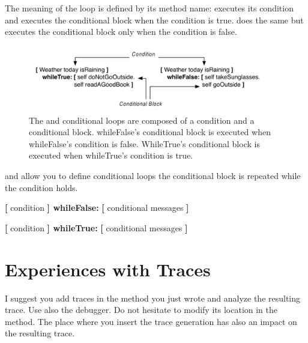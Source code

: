 

The meaning of the loop is defined by its method name:  executes its condition and  executes the conditional block when the condition is true.   does the same but executes the conditional block only when the condition is false. 

\begin{figure}[h]
\begin{center}\includegraphics{conditionalLoopsPicture}
\caption{The  and  conditional loops are composed of a condition and a conditional block. whileFalse's conditional block is executed when whileFalse's condition is false. WhileTrue's conditional block is executed when whileTrue's condition is true. \label{fig:conditionalLoopsPicturehere}}
\end{center}
\end{figure}

 and  allow you to define conditional loops \ie the conditional block is repeated while the condition holds. \\
\begin{nalltt}
\textbf{[} condition \textbf{] whileFalse:}
  \textbf{[} conditional messages \textbf{]}

\textbf{[} condition \textbf{] whileTrue:}
  \textbf{[} conditional messages \textbf{]}
\end{nalltt}




\section{Experiences with Traces}
I suggest you add traces in the method you just wrote and analyze the resulting trace. Use also the debugger. Do not hesitate to modify its location in the method. The place where you insert the trace generation has also an impact on the resulting trace. 

